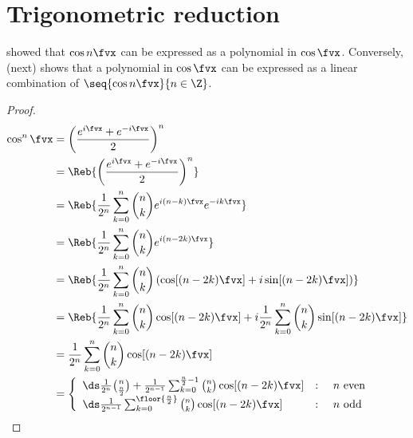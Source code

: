 \section{Trigonometric reduction}
 showed that $\cos n\fvx$ can be expressed as 
a polynomial in $\cos\fvx$.
Conversely,  (next) shows that 
a polynomial in $\cos\fvx$
can be expressed as a linear combination of $\seq{\cos n\fvx}{n\in\Z}$.
\begin{theorem}
\label{thm:cos^nx}
\end{theorem}
\begin{proof}
\begin{align*}
  \cos^n\fvx
    &=  \left( \frac{e^{i\fvx}+e^{-i\fvx}}{2} \right)^n
  \\&=  \Reb{\left( \frac{e^{i\fvx}+e^{-i\fvx}}{2} \right)^n}
  \\&=  \Reb{\frac{1}{2^n} \sum_{k=0}^n {n\choose k} e^{i(n-k)\fvx}e^{-ik\fvx} }
  \\&=  \Reb{\frac{1}{2^n} \sum_{k=0}^n {n\choose k} e^{i(n-2k)\fvx}}
  \\&=  \Reb{\frac{1}{2^n} \sum_{k=0}^n {n\choose k} \left(\cos[(n-2k)\fvx]+i\sin[(n-2k)\fvx] \right) }
  \\&=  \Reb{\frac{1}{2^n} \sum_{k=0}^n {n\choose k} \cos[(n-2k)\fvx]+
             i\frac{1}{2^n} \sum_{k=0}^n {n\choose k} \sin[(n-2k)\fvx]  }
  \\&=  \frac{1}{2^n} \sum_{k=0}^n {n\choose k}\cos[(n-2k)\fvx] 
  \\&=  \left\{\begin{array}{lcl}\ds
      \frac{1}{2^n}{n\choose\frac{n}{2}} + 
      \frac{1}{2^{n-1}} \sum_{k=0}^{\frac{n}{2}-1} {n\choose k}\cos[(n-2k)\fvx] 
      &:&\mbox{ $n$ even}
      \\ \ds
      \frac{1}{2^{n-1}} \sum_{k=0}^{\floor{\frac{n}{2}}} {n\choose k}\cos[(n-2k)\fvx] 
      &:&\mbox{ $n$ odd}
    \end{array}\right.
\end{align*}
\end{proof}

